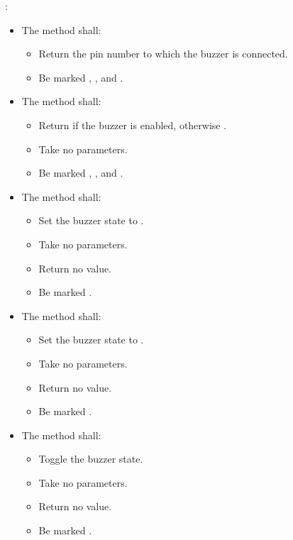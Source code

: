\begin{parts}
    :
  \begin{itemize}
    \item The method  shall:
    \begin{itemize}
      \item Return the pin number to which the buzzer is connected.
      \item Be marked , , and \code{[[nodiscard]]}.
    \end{itemize}
    \item The method  shall:
    \begin{itemize}
      \item Return  if the buzzer is enabled, otherwise .
      \item Take no parameters.
      \item Be marked , , and \code{[[nodiscard]]}.
    \end{itemize}
    \item The method  shall:
    \begin{itemize}
      \item Set the buzzer state to .
      \item Take no parameters.
      \item Return no value.
      \item Be marked .
    \end{itemize}
    \item The method  shall:
    \begin{itemize}
      \item Set the buzzer state to .
      \item Take no parameters.
      \item Return no value.
      \item Be marked .
    \end{itemize}
    \item The method  shall:
    \begin{itemize}
      \item Toggle the buzzer state.
      \item Take no parameters.
      \item Return no value.
      \item Be marked .
    \end{itemize}
  \end{itemize}

\end{parts}
